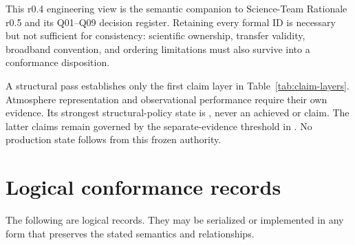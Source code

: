 \documentclass[10pt]{article}
\begin{document}
This r0.4 engineering view is the semantic companion to Science-Team
Rationale r0.5 and its Q01--Q09 decision register. Retaining every formal ID is
necessary but not sufficient for consistency: scientific
ownership, transfer validity, broadband convention, and ordering limitations
must also survive into a conformance disposition.

A structural pass establishes only the first claim layer in
Table~\ref{tab:claim-layers}. Atmosphere representation and observational
performance require their own evidence. Its strongest structural-policy state
is , never an achieved
 or  claim. The latter claims
remain governed by the separate-evidence threshold in . No production
state follows from this frozen authority.

\section{Logical conformance records}
\label{sec:eng-records}

The following are logical records. They may be serialized or implemented in
any form that preserves the stated semantics and relationships.
\end{document}
